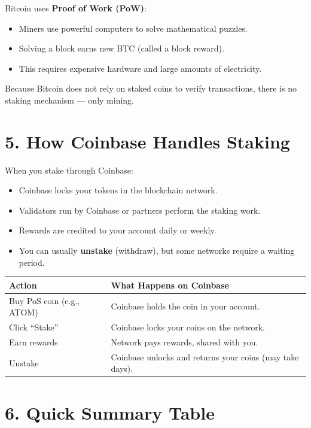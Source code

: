 \documentclass{article}
\begin{document}
Bitcoin uses \textbf{Proof of Work (PoW)}:
\begin{itemize}
  \item Miners use powerful computers to solve mathematical puzzles.
  \item Solving a block earns new BTC (called a block reward).
  \item This requires expensive hardware and large amounts of electricity.
\end{itemize}

Because Bitcoin does not rely on staked coins to verify transactions,  
there is no staking mechanism --- only mining.

\bigskip

\section*{5. How Coinbase Handles Staking}

When you stake through Coinbase:
\begin{itemize}
  \item Coinbase locks your tokens in the blockchain network.
  \item Validators run by Coinbase or partners perform the staking work.
  \item Rewards are credited to your account daily or weekly.
  \item You can usually \textbf{unstake} (withdraw), but some networks require a waiting period.
\end{itemize}

\begin{center}
\begin{tabular}{@{}ll@{}}
\toprule
\textbf{Action} & \textbf{What Happens on Coinbase} \\
\midrule
Buy PoS coin (e.g., ATOM) & Coinbase holds the coin in your account. \\
Click ``Stake'' & Coinbase locks your coins on the network. \\
Earn rewards & Network pays rewards, shared with you. \\
Unstake & Coinbase unlocks and returns your coins (may take days). \\
\bottomrule
\end{tabular}
\end{center}

\bigskip

\section*{6. Quick Summary Table}
\end{document}
